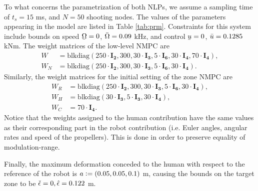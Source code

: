 To what concerns the parametrization of both NLPs, we assume a sampling time of $t_s = 15$ ms, and $N=50$ shooting nodes. The values of the parameters appearing in the model are listed in Table \ref{tab:prm}. Constraints for this system include bounds on speed $\ubar{\Omega} = 0$, $\Bar{\Omega} = 0.09$ kHz, and control $\ubar{u} = 0$, $\Bar{u} =  0.1285$ kNm. The weight matrices of the low-level NMPC are
\begin{equation*}
\begin{aligned}
	W & = \text{blkdiag}(250\cdot\mathbf{I_2},300, 30\cdot\mathbf{I_3},5\cdot\mathbf{I_6},30\cdot\mathbf{I_4},70\cdot\mathbf{I_4}), \\
	W_N & = \text{blkdiag}(250\cdot\mathbf{I_2},300, 30\cdot\mathbf{I_3},5\cdot\mathbf{I_6},30\cdot\mathbf{I_4}).
\end{aligned}
\end{equation*}
Similarly, the weight matrices for the initial setting of the zone NMPC are
\begin{equation*}
\begin{aligned}
		W_R & = \text{blkdiag}(250\cdot\mathbf{I_2},300, 30\cdot\mathbf{I_3},5\cdot\mathbf{I_6},30\cdot\mathbf{I_4}),\\
		W_H & = \text{blkdiag}(30\cdot\mathbf{I_3},5\cdot\mathbf{I_3},30\cdot\mathbf{I_4}),\\
		W_C & = 70\cdot\mathbf{I_4}.
\end{aligned}
\end{equation*}
Notice that the weights assigned to the human contribution have the same values as their corresponding part in the robot contribution (i.e. Euler angles, angular rates and speed of the propellers). This is done in order to preserve equality of modulation-range.  

Finally, the maximum deformation conceded to the human with respect to the reference of the robot is $a \vcentcolon = (0.05,0.05,0.1)$ m, causing the bounds on the target zone to be $\check{\epsilon}=0, \Hat{\epsilon} = 0.122$ m.

